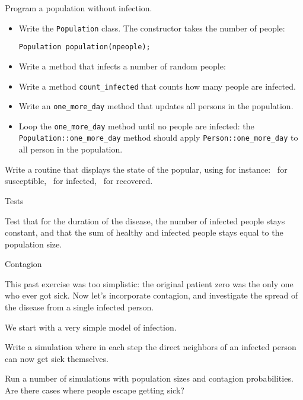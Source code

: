 \begin{exercise}
  \label{ex:infect:notransfer}
  Program a population without infection.
  \begin{itemize}
  \item Write the \lstinline{Population} class. The constructor takes the number of people:
\begin{lstlisting}
Population population(npeople);  
\end{lstlisting}

  \item Write a method that infects a number of random people:

  \item Write a method \lstinline{count_infected} that counts how many people are infected.
  \item Write an \lstinline{one_more_day} method that updates all persons in the population.
  \item Loop the \lstinline{one_more_day} method until no people are infected: the
    \lstinline{Population::one_more_day} method should apply \lstinline{Person::one_more_day} to
    all person in the population.
  \end{itemize}
\item Write a routine that displays the state of the popular, using
  for instance: ~for susceptible, \n{+}~for infected, \n{-}~for recovered.
\end{exercise}

 {Tests}

Test that for the duration of the disease,
the number of infected people stays constant,
and that the sum of healthy and infected people stays equal to the population size.

 {Contagion}

This past exercise was too simplistic: the original patient zero was
the only one who ever got sick.
Now let's incorporate contagion, and investigate the spread of the disease
from a single infected person.

We start with a very simple model of infection.

\begin{exercise}
  \label{ex:infect:1}
  Write a simulation where in each step the direct neighbors of an infected person
  can now get sick themselves.

    Run a number of simulations with population sizes and contagion
    probabilities. Are there cases where people escape getting sick?
\end{exercise}

